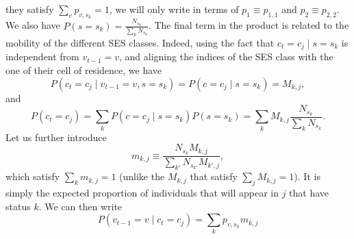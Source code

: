 \documentclass[../thesis.tex]{subfiles}
\begin{document}
they satisfy $\sum_v p_{v, s_k} = 1$, we will only write in terms of $p_1 \equiv p_{1,
1}$ and $p_2 \equiv p_{2, 2}$. We also have $P(s = s_k) = \frac{N_{s_k}}{\sum_k
N_{s_k}}$. The final term in the product is related to the mobility of the
different SES classes. Indeed, using the fact that $c_t = c_j \mid s = s_k$ is
independent from $v_{t-1} = v$, and aligning the indices of the SES class with the one
of their cell of residence, we have
\begin{equation}
\label{eq:mob_by_SES}
    P(c_t = c_j \mid v_{t-1} = v, s = s_k) = P(c = c_j \mid s = s_k) = M_{k, j},
\end{equation}
and
\begin{equation}
    P(c_t = c_j) = \sum_k P(c = c_j \mid s = s_k) P(s = s_k) = \sum_k M_{k, j} \frac{N_{s_k}}{\sum_k
    N_{s_k}}.
\end{equation}
Let us further introduce
\begin{equation}
    m_{k, j} \equiv \frac{N_{s_k} M_{k, j}}{\sum_{k'} N_{s_{k'}} M_{k', j}},
\end{equation}
which satisfy $\sum_k m_{k, j} = 1$ (unlike the $M_{k, j}$ that satisfy $\sum_j M_{k, j}
= 1$). It is simply the expected proportion of individuals that will appear in $j$ that
have status $k$. We can then write
\begin{equation}
\label{eq:decomp_prev_by_SES}
    P(v_{t-1} = v \mid c_t = c_j) = \sum_k p_{v, s_k} m_{k, j}
\end{equation}
\end{document}
